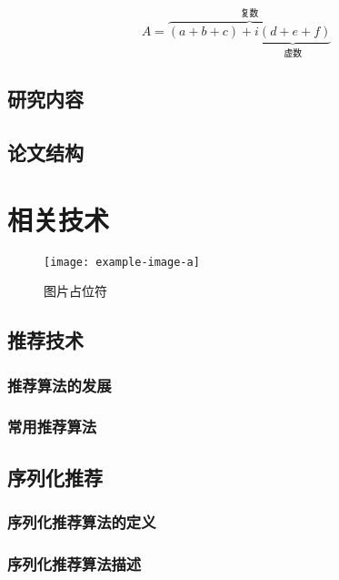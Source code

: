 \begin{equation}
    \label{equ:sample}
    A=\overbrace{(a+b+c)+\underbrace{i(d+e+f)}_{\text{虚数}}}^{\text{复数}}
\end{equation}

\section{研究内容}

\section{论文结构}

\chapter{相关技术}

\begin{figure}[htbp]
    \centering
    \texttt{[image: example-image-a]}
    \caption{\label{fig:fig-placeholder}图片占位符}
\end{figure}

\section{推荐技术}


\subsection{推荐算法的发展}


\subsection{常用推荐算法}


\section{序列化推荐}


\subsection{序列化推荐算法的定义}


\subsection{序列化推荐算法描述}



